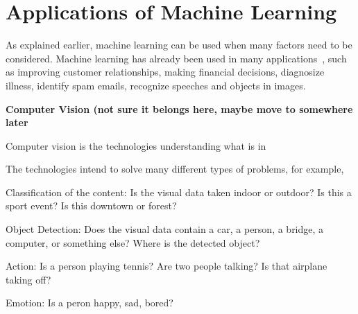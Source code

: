 \section{Applications of Machine Learning}

As explained earlier, machine learning can be used when many factors
need to be considered.  Machine learning has already been used in many
applications~\cite{Alpaydin2010IntroductiontoMachine}, such as
improving customer relationships, making financial decisions,
diagnosize illness, identify spam emails, recognize speeches and
objects in images.

\vspace{0.1in}


    {\bf Computer Vision (not sure it belongs here, maybe move to
    somewhere later}


  Computer vision is the technologies understanding what is in

 The
technologies intend to solve many different types of problems, for
example,

 Classification of the content: Is the visual data taken indoor
  or outdoor?  Is this a sport event?  Is this downtown or forest?

 Object Detection: Does the visual data contain a car, a person,
  a bridge, a computer, or something else?  Where is the detected
  object?

 Action: Is a person playing tennis? Are two people talking?
  Is that airplane taking off?

 Emotion: Is a peron happy, sad, bored?





